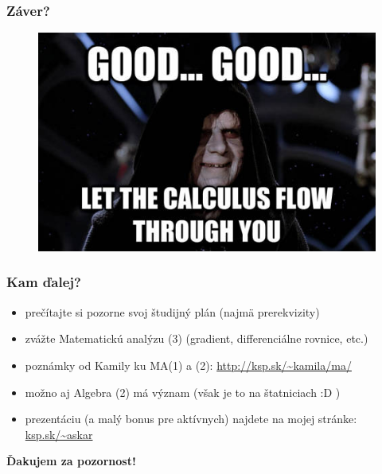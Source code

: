 \documentclass{beamer}
\begin{document}
\begin{frame}
\frametitle{Záver?}
\begin{figure}
\includegraphics[height=0.8\textheight]{images/let_calculus_flow.jpg}
\end{figure}
\end{frame}

\begin{frame}
\frametitle{Kam ďalej?}
\begin{itemize}
\item prečítajte si pozorne svoj študijný plán (najmä prerekvizity)
\pause
\item zvážte Matematickú analýzu (3) (gradient, differenciálne rovnice, etc.)
\pause
\item poznámky od Kamily ku MA(1) a (2): \url{http://ksp.sk/~kamila/ma/}
\pause 
\item možno aj Algebra (2) má význam \pause (však je to na štatniciach :D )
\pause
\item prezentáciu (a malý bonus pre aktívnych) najdete na mojej stránke: \url{ksp.sk/~askar}
\end{itemize}
\pause 

\begin{LARGE}
\begin{center}
\textbf{Ďakujem za pozornost!}

\end{center}
\end{LARGE}

\end{frame}
\end{document}
